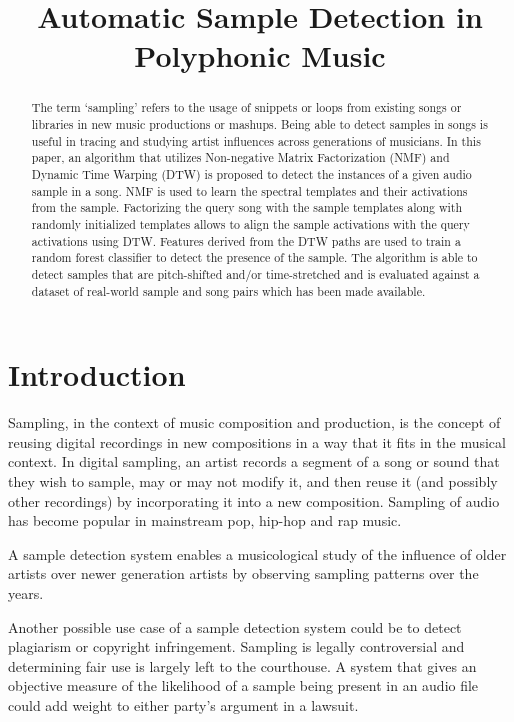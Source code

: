 \documentclass{article}
\title{Automatic Sample Detection in Polyphonic Music}
\begin{document}
%
\maketitle
%
\begin{abstract}
The term `sampling' refers to the usage of snippets or loops from existing songs or libraries in new music productions or mashups. Being able to detect samples in songs is useful in tracing and studying artist influences across generations of musicians. In this paper, an algorithm that utilizes Non-negative Matrix Factorization (NMF) and Dynamic Time Warping (DTW) is proposed to detect the instances of a given audio sample in a song. NMF is used to learn the spectral templates and their activations from the sample. Factorizing the query song with the sample templates along with randomly initialized templates allows to align the sample activations with the query activations using DTW. Features derived from the DTW paths are used to train a random forest classifier to detect the presence of the sample. The algorithm is able to detect samples that are pitch-shifted and/or time-stretched and is evaluated against a dataset of real-world sample and song pairs which has been made available. 
\end{abstract}
%
\section{Introduction}
\label{sec:intro}

Sampling, in the context of music composition and production, is the concept of reusing digital recordings in new compositions in a way that it fits in the musical context. In digital sampling, an artist records a segment of a song or sound that they wish to sample, may or may not modify it, and then reuse it (and possibly other recordings) by incorporating it into a new composition. Sampling of audio has become popular in mainstream pop, hip-hop and rap music. 

A sample detection system enables a musicological study of the influence of older artists over newer generation artists by observing sampling patterns over the years.

Another possible use case of a sample detection system could be to detect plagiarism or copyright infringement. Sampling is legally controversial and determining fair use is largely left to the courthouse. A system that gives an objective measure of the likelihood of a sample being present in an audio file could add weight to either party's argument in a lawsuit.
\end{document}
